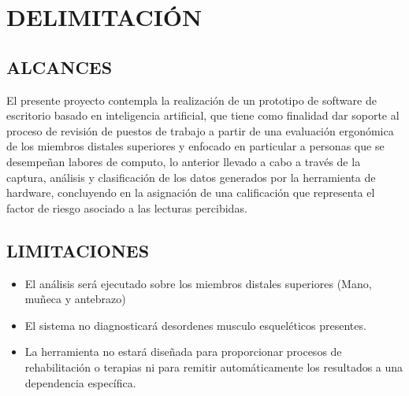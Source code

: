 \chapter{DELIMITACIÓN}
\section{ALCANCES}
El presente proyecto contempla la realización de un prototipo de software de escritorio basado en inteligencia artificial, que tiene como finalidad dar soporte al proceso de revisión de puestos de trabajo a partir de una evaluación ergonómica de los miembros distales superiores y enfocado en particular a personas que se desempeñan labores de computo, lo anterior llevado a cabo a través de la captura, análisis y clasificación de los datos generados por la herramienta de hardware, concluyendo en la asignación de una calificación que representa el factor de riesgo asociado a las lecturas percibidas.

\section{LIMITACIONES}
\begin{itemize}
\item El análisis será ejecutado sobre los miembros distales superiores (Mano, muñeca y antebrazo)
\item El sistema no diagnosticará desordenes musculo esqueléticos presentes.
\item La herramienta no estará diseñada para proporcionar procesos de rehabilitación o terapias ni para remitir automáticamente los resultados a una dependencia específica.
\end{itemize}
